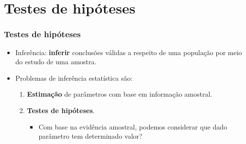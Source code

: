 \documentclass[10pt,
  aspectratio=169,
  serif,
  mathserif,
  professionalfont,
  compress,
  handout,
  ]{beamer}\usepackage[]{graphicx}\usepackage[]{color}
\begin{document}

\section{Testes de hipóteses}


\begin{frame}
  \frametitle{Testes de hipóteses}
  \begin{itemize}
    \itemsep 2ex
  
  \item Inferência: \textbf{inferir} conclusões válidas a respeito de uma população por meio do estudo de uma amostra.
  
  \item Problemas de inferência estatística são:
    \begin{enumerate}
    
      \itemsep 2ex
      
      \item \textbf{Estimação} de parâmetros com base em informação amostral.
      
      \item \textbf{Testes de hipóteses}.
        \begin{itemize}
          \item Com base na evidência amostral, podemos considerar que dado parâmetro tem determinado valor?
        \end{itemize}
    
    \end{enumerate}
  
  \end{itemize}
  
\end{frame}

\end{document}
